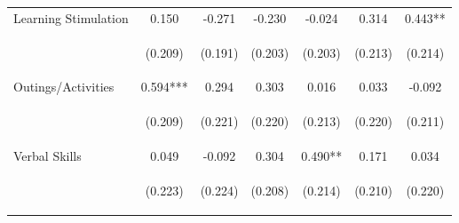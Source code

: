 \begin{tabular}{lcccccc}
\noalign{\smallskip}Learning Stimulation & 0.150 & -0.271 & -0.230 & -0.024 & 0.314 & 0.443**\\
 & \begin{footnotesize}(0.209)\end{footnotesize} & \begin{footnotesize}(0.191)\end{footnotesize} & \begin{footnotesize}(0.203)\end{footnotesize} & \begin{footnotesize}(0.203)\end{footnotesize} & \begin{footnotesize}(0.213)\end{footnotesize} & \begin{footnotesize}(0.214)\end{footnotesize}\\
\noalign{\smallskip}Outings/Activities & 0.594*** & 0.294 & 0.303 & 0.016 & 0.033 & -0.092\\
 & \begin{footnotesize}(0.209)\end{footnotesize} & \begin{footnotesize}(0.221)\end{footnotesize} & \begin{footnotesize}(0.220)\end{footnotesize} & \begin{footnotesize}(0.213)\end{footnotesize} & \begin{footnotesize}(0.220)\end{footnotesize} & \begin{footnotesize}(0.211)\end{footnotesize}\\
\noalign{\smallskip}Verbal Skills & 0.049 & -0.092 & 0.304 & 0.490** & 0.171 & 0.034\\
 & \begin{footnotesize}(0.223)\end{footnotesize} & \begin{footnotesize}(0.224)\end{footnotesize} & \begin{footnotesize}(0.208)\end{footnotesize} & \begin{footnotesize}(0.214)\end{footnotesize} & \begin{footnotesize}(0.210)\end{footnotesize} & \begin{footnotesize}(0.220)\end{footnotesize}\\

\end{tabular}
